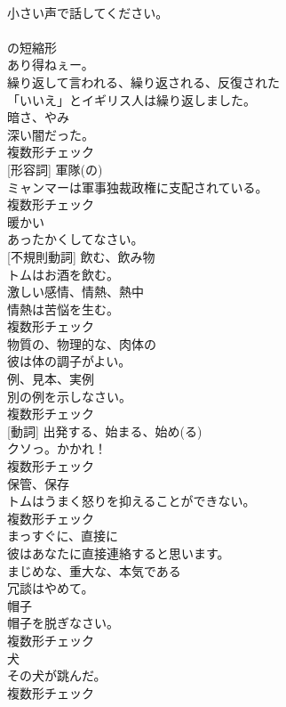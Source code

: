 \documentclass[8pt]{extreport}
\begin{document}
\begin{CJK}{UTF8}{min}
\\	小さい声で話してください。	
\\	[短縮形]	
\\	の短縮形	
\\	あり得ねぇー。	
\\	[形容詞]	繰り返して言われる、繰り返される、反復された	
\\	「いいえ」とイギリス人は繰り返しました。	
\\	[名詞]	暗さ、やみ	
\\	深い闇だった。	
\\	複数形チェック
\\	[名詞] [形容詞]	軍隊(の)	
\\	ミャンマーは軍事独裁政権に支配されている。	
\\	複数形チェック
\\	[形容詞]	暖かい	
\\	あったかくしてなさい。	
\\	[動詞] [不規則動詞]	飲む、飲み物	
\\	トムはお酒を飲む。	
\\	[名詞]	激しい感情、情熱、熱中	
\\	情熱は苦悩を生む。	
\\	複数形チェック
\\	[形容詞]	物質の、物理的な、肉体の	
\\	彼は体の調子がよい。	
\\	[名詞]	例、見本、実例	
\\	別の例を示しなさい。	
\\	複数形チェック
\\	[名詞] [動詞]	出発する、始まる、始め(る)	
\\	クソっ。かかれ！	
\\	複数形チェック
\\	[名詞]	保管、保存	
\\	トムはうまく怒りを抑えることができない。	
\\	複数形チェック
\\	[副詞]	まっすぐに、直接に	
\\	彼はあなたに直接連絡すると思います。	
\\	[形容詞]	まじめな、重大な、本気である	
\\	冗談はやめて。	
\\	[名詞]	帽子	
\\	帽子を脱ぎなさい。	
\\	複数形チェック
\\	[名詞]	犬	
\\	その犬が跳んだ。	
\\	複数形チェック

\end{CJK}
\end{document}
